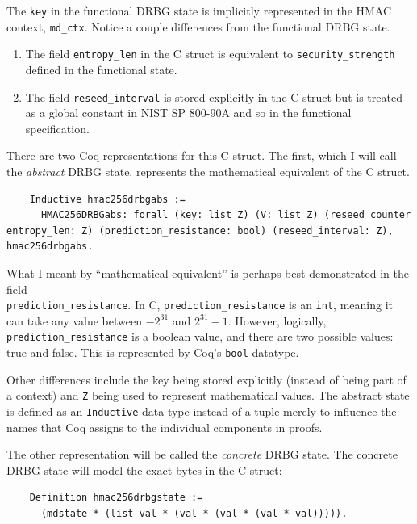 \documentclass[pageno]{jpaper}
\begin{document}
The \lstinline{key} in the functional DRBG state is implicitly represented in the HMAC context, \lstinline{md_ctx}. Notice a couple differences from the functional DRBG state.


\begin{enumerate}
\item The field \lstinline{entropy_len} in the C struct is equivalent to \lstinline{security_strength} defined in the functional state.
\item The field \lstinline{reseed_interval} is stored explicitly in the C struct but is treated as a global constant in NIST SP 800-90A and so in the functional specification.
\end{enumerate}


There are two Coq representations for this C struct. The first, which I will call the \textit{abstract} DRBG state, represents the mathematical equivalent of the C struct.

\begin{lstlisting}
    Inductive hmac256drbgabs :=
      HMAC256DRBGabs: forall (key: list Z) (V: list Z) (reseed_counter entropy_len: Z) (prediction_resistance: bool) (reseed_interval: Z), hmac256drbgabs.
\end{lstlisting}

What I meant by “mathematical equivalent” is perhaps best demonstrated in the field \\ \lstinline{prediction_resistance}. In C, \lstinline{prediction_resistance} is an \lstinline{int}, meaning it can take any value between $-2^{31}$ and $2^{31} - 1$. However, logically, \lstinline{prediction_resistance} is a boolean value, and there are two possible values: true and false. This is represented by Coq’s \lstinline{bool} datatype.

Other differences include the key being stored explicitly (instead of being part of a context) and \lstinline{Z} being used to represent mathematical values. The abstract state is defined as an \lstinline{Inductive} data type instead of a tuple merely to influence the names that Coq assigns to the individual components in proofs.

The other representation will be called the \textit{concrete} DRBG state. The concrete DRBG state will model the exact bytes in the C struct:

\begin{lstlisting}
    Definition hmac256drbgstate :=
      (mdstate * (list val * (val * (val * (val * val))))).
\end{lstlisting}
\end{document}
